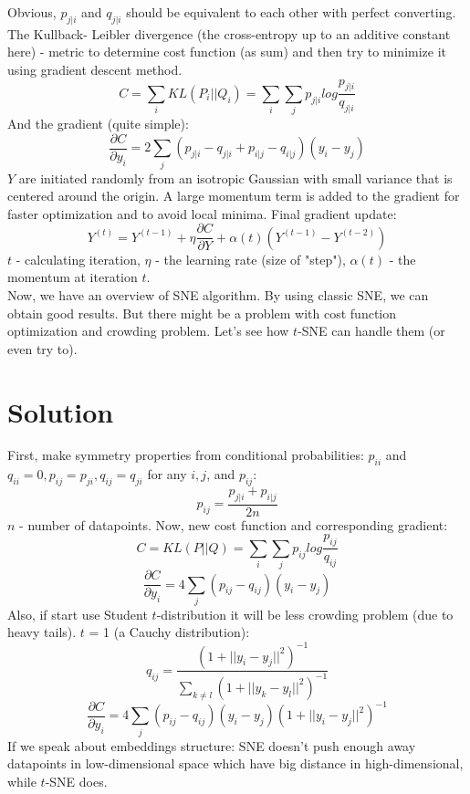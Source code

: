 Obvious, $p_{j|i}$ and $q_{j|i}$ should be equivalent to each other with perfect converting. The Kullback-
Leibler divergence (the cross-entropy up to an additive constant here) - metric to determine cost function (as sum) and then try to minimize it using gradient descent method.
\begin{equation}
    C = \sum_i{KL(P_i||Q_i)} = \sum_i{\sum_j{p_{j|i}log{\frac{p_{j|i}}{q_{j|i}}}}}
\end{equation}
And the gradient (quite simple):
$$ \frac{\partial C}{\partial y_i} = 2 \sum_j{(p_{j|i} - q_{j|i} + p_{i|j} - q_{i|j})(y_i - y_j)} $$
$Y$ are initiated randomly from an isotropic Gaussian with small variance that is centered around the origin. A large momentum term is added to the gradient for faster optimization and to avoid local minima. Final gradient update:
$$ Y^{(t)} = Y^{(t-1)} + \eta \frac{\partial C}{\partial Y} + \alpha(t)(Y^{(t-1)} - Y^{(t-2)})$$
$t$ - calculating iteration, $\eta$ - the learning rate (size of "step"), $\alpha(t)$ - the momentum at iteration $t$.\\

Now, we have an overview of SNE algorithm. By using classic SNE, we can obtain good results. But there might be a problem with cost function optimization and crowding problem. Let's see how $t$-SNE can handle them (or even try to).

\section{Solution}

First, make symmetry properties from conditional probabilities: $p_{ii}$ and $q_{ii} = 0, p_{ij} = p_{ji}, q_{ij} = q_{ji}$ for any $i, j$, and $p_{ij}$:
$$ p_{ij} = \frac{p_{j|i} + p_{i|j}}{2n} $$
$n$ - number of datapoints. Now, new cost function and corresponding gradient:
$$ C = KL(P||Q) = \sum_i{\sum_j{p_{ij}log{\frac{p_{ij}}{q_{ij}}}}} $$
$$ \frac{\partial C}{\partial y_i} = 4 \sum_j{(p_{ij} - q_{ij})(y_i - y_j)} $$
Also, if start use Student $t$-distribution it will be less crowding problem (due to heavy tails). $t$ = 1 (a Cauchy distribution):
\begin{equation}
    q_{ij} = \frac{(1 + ||y_i - y_j||^2)^{-1}}{\sum_{k \ne l}{(1 + ||y_k - y_l||^2)^{-1}}}
\end{equation}
\begin{equation}
    \frac{\partial C}{\partial y_i} = 4 \sum_j{(p_{ij} - q_{ij})(y_i - y_j)(1 + ||y_i - y_j||^2)^{-1}}
\end{equation}
If we speak about embeddings structure: SNE doesn't push enough away datapoints in low-dimensional space which have big distance in high-dimensional, while $t$-SNE does.\\

